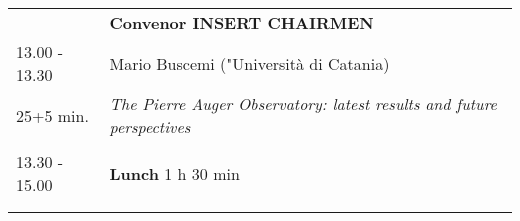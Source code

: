 \begin{longtable}{p{3cm}p{13cm}}
&\hfill {\bf Convenor INSERT CHAIRMEN }\\ 
13.00 - 13.30 & Mario Buscemi ("Università di Catania)\\ 
25+5 min. & {\it The Pierre Auger Observatory: latest results and future perspectives}\\ 
 & \\ 
13.30 - 15.00 & {\bf Lunch} \hfill 1 h 30 min \\ 
 & \\ 
 & \\ 
\end{longtable}

